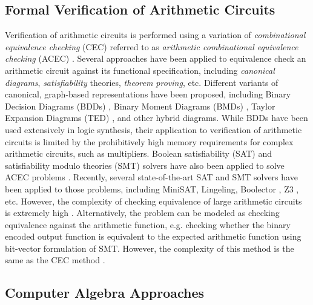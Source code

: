 \subsection{Formal Verification of Arithmetic Circuits}
Verification of arithmetic circuits is performed using a variation of \textit{combinational equivalence checking} (CEC) referred to as \textit{arithmetic combinational equivalence checking} (ACEC) \cite{sayedformal:date-2016}. Several approaches have been applied to equivalence check an arithmetic circuit against its functional specification, including \textit{canonical diagrams}, \textit{satisfiability} theories, \textit{theorem proving}, etc. Different variants of canonical, graph-based representations have been proposed, including Binary Decision Diagrams (BDDs) \cite{bryant:1986-bdd}, Binary Moment Diagrams (BMDs) \cite{bmd95} \cite{bryant:tr97}, Taylor Expansion Diagrams (TED) \cite{ted:tcomp06}, and other hybrid diagrams.
%
While BDDs have been used extensively in logic synthesis, their application to verification of arithmetic circuits is limited by the prohibitively high memory requirements for complex arithmetic circuits, such as multipliers. 
Boolean satisfiability (SAT) and satisfiability modulo theories (SMT) solvers have also been applied to solve ACEC problems \cite{goldberg2001using}. Recently, several state-of-the-art SAT and SMT solvers have been applied to those problems, including MiniSAT\cite{sorensson:2005-minisat}, Lingeling\cite{biere2013lingeling}, Boolector \cite{niemetz:2015boolector}, Z3 \cite{de:2008-z3}, etc. However, the complexity of checking equivalence of large arithmetic circuits is extremely high \cite{pruss2015TCAD:efficient}\cite{yu:2016-tcad-verification}. Alternatively, the problem can be modeled as checking equivalence against the arithmetic function, e.g. checking whether the binary encoded output function is equivalent to the expected arithmetic function using bit-vector formulation of SMT. However, the complexity of this method is the same as the CEC method \cite{yu:2016-tcad-verification}. 

\subsection{Computer Algebra Approaches}

